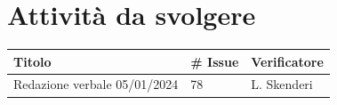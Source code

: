 \documentclass{article}
\begin{document}
\section{Attività da svolgere}
    \begin{center}
        \begin{tabular}{|C{7cm}|C{1,5cm}|C{3cm}|}
            \hline
            \textbf{Titolo} & \textbf{\# Issue} & \textbf{Verificatore} \\
            \hline\hline
            Redazione verbale 05/01/2024 & 78 & L. Skenderi \\
            \hline
        \end{tabular}
    \end{center}
\end{document}

